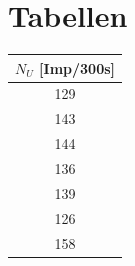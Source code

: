 \section{Tabellen}
\begin{minipage}{\linewidth}
    \begin{table}[H]
        \centering
    
    \begin{tabular}{c}
        \toprule
        $N_U$ [Imp/300s]\\
        \midrule
        129 \\
        143 \\
        144 \\
        136 \\
        139 \\
        126 \\
        158 \\
        \bottomrule
        
    \end{tabular}
    \label{tab:1}
\end{table}
\end{minipage}


